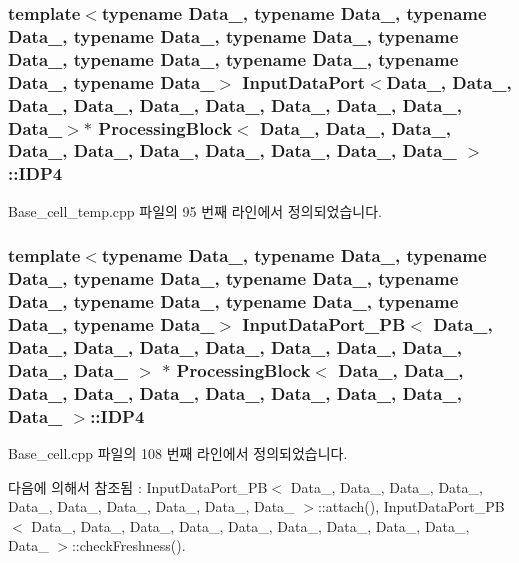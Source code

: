 \subsubsection[{\texorpdfstring{I\+D\+P4}{IDP4}}]{\setlength{\rightskip}{0pt plus 5cm}template$<$typename Data\+\_, typename Data\+\_, typename Data\+\_, typename Data\+\_, typename Data\+\_, typename Data\+\_, typename Data\+\_, typename Data\+\_, typename Data\+\_, typename Data\+\_$>$ {\bf Input\+Data\+Port}$<$Data\+\_, Data\+\_, Data\+\_, Data\+\_, Data\+\_, Data\+\_, Data\+\_, Data\+\_, Data\+\_, Data\+\_$>$$\ast$ {\bf Processing\+Block}$<$ Data\+\_, Data\+\_, Data\+\_, Data\+\_, Data\+\_, Data\+\_, Data\+\_, Data\+\_, Data\+\_, Data\+\_ $>$\+::I\+D\+P4}\hypertarget{classProcessingBlock_a4253011fab5d88efa3653bc2cba4e877}{}\label{classProcessingBlock_a4253011fab5d88efa3653bc2cba4e877}


Base\+\_\+cell\+\_\+temp.\+cpp 파일의 95 번째 라인에서 정의되었습니다.

\subsubsection[{\texorpdfstring{I\+D\+P4}{IDP4}}]{\setlength{\rightskip}{0pt plus 5cm}template$<$typename Data\+\_, typename Data\+\_, typename Data\+\_, typename Data\+\_, typename Data\+\_, typename Data\+\_, typename Data\+\_, typename Data\+\_, typename Data\+\_, typename Data\+\_$>$ {\bf Input\+Data\+Port\+\_\+\+PB}$<$ Data\+\_, Data\+\_, Data\+\_, Data\+\_, Data\+\_, Data\+\_, Data\+\_, Data\+\_, Data\+\_, Data\+\_ $>$ $\ast$ {\bf Processing\+Block}$<$ Data\+\_, Data\+\_, Data\+\_, Data\+\_, Data\+\_, Data\+\_, Data\+\_, Data\+\_, Data\+\_, Data\+\_ $>$\+::I\+D\+P4}\hypertarget{classProcessingBlock_abe3e7619f99a071be46aa27ff060fef7}{}\label{classProcessingBlock_abe3e7619f99a071be46aa27ff060fef7}


Base\+\_\+cell.\+cpp 파일의 108 번째 라인에서 정의되었습니다.



다음에 의해서 참조됨 \+:  Input\+Data\+Port\+\_\+\+P\+B$<$ Data\+\_, Data\+\_, Data\+\_, Data\+\_, Data\+\_, Data\+\_, Data\+\_, Data\+\_, Data\+\_, Data\+\_ $>$\+::attach(), Input\+Data\+Port\+\_\+\+P\+B$<$ Data\+\_, Data\+\_, Data\+\_, Data\+\_, Data\+\_, Data\+\_, Data\+\_, Data\+\_, Data\+\_, Data\+\_ $>$\+::check\+Freshness().


